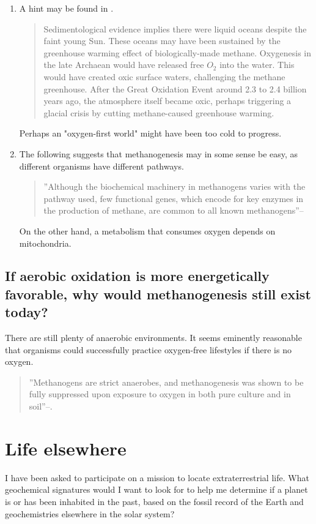\documentclass[]{article}
\begin{document}
\begin{enumerate}
	\item A hint may be found in \cite{nisbet2011evolution}.\begin{quote}
		Sedimentological evidence implies there were liquid oceans despite the faint young Sun. These oceans may have been sustained by the greenhouse warming effect of biologically-made methane. Oxygenesis in the late Archaean would have released free $O_2$ into the water. This would have created oxic surface waters, challenging the methane greenhouse. After the Great Oxidation Event around 2.3 to 2.4 billion years ago, the atmosphere itself became oxic, perhaps triggering a glacial crisis by cutting methane-caused greenhouse warming.
	\end{quote}
	Perhaps an "oxygen-first world" might have been too cold to progress.
	\item The following suggests that methanogenesis may in some sense be easy, as different organisms have different pathways.
	\begin{quote}
		''Although the biochemical machinery in methanogens varies with the pathway used, few functional genes, which encode for key enzymes in the production of methane, are common to all known methanogens''--\cite{angel2012methanogenic}
	\end{quote}
	On the other hand, a metabolism that consumes oxygen depends on mitochondria.
\end{enumerate}


\subsection[Why would methanogenesis still exist today?]{
	If aerobic oxidation is more energetically favorable, why would methanogenesis still exist today?
}
There are still plenty of anaerobic environments. It seems eminently reasonable that organisms could successfully practice oxygen-free lifestyles if there is no oxygen.
\begin{quote}
	''Methanogens are strict anaerobes, and methanogenesis was shown to be fully suppressed upon exposure to oxygen in both pure culture and in soil''--\cite{angel2012methanogenic}.
\end{quote}

\section{Life elsewhere}

I have been asked to participate on a mission to locate extraterrestrial life. What geochemical signatures would I want to look for to help me determine if a planet is or has been inhabited in the past, based on the fossil record of the Earth and geochemistries elsewhere in the solar system?
\end{document}
